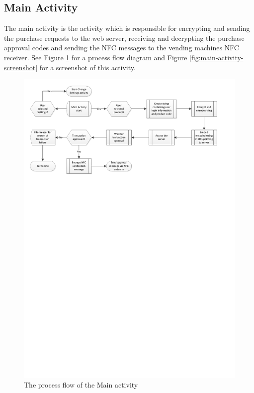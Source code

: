 \subsection{Main Activity}

The main activity is the activity which is responsible for encrypting and
sending the purchase requests to the web server, receiving and decrypting
the purchase approval codes and sending the NFC messages to the vending machines
NFC receiver. See Figure \ref{fig:main-activity} for a process flow diagram
and Figure \ref{fig:main-activity-screenshot} for a screenshot of this activity.

\begin{figure}
 \centering 
 \includegraphics[clip = true, trim = 0 570 0 20,
 scale=0.7]{app_main_processflow}
 \caption{The process flow of the Main activity}
 \label{fig:main-activity}
\end{figure}

